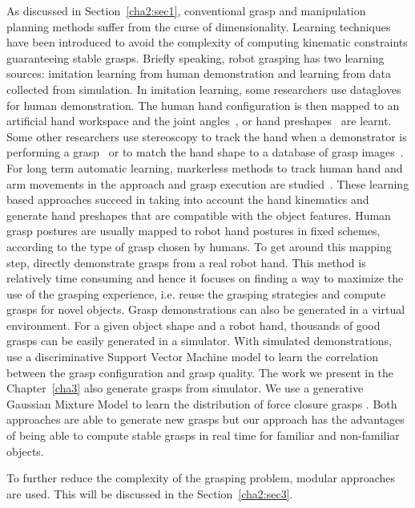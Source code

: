 As discussed in Section~\ref{cha2:sec1},
conventional grasp and manipulation planning methods suffer from the curse of dimensionality.
Learning techniques have been introduced to avoid the complexity of computing kinematic constraints guaranteeing stable grasps. Briefly speaking, robot grasping has two learning sources: imitation learning from human demonstration and learning from data collected from simulation.
In imitation learning, some researchers use datagloves for human demonstration. The human hand configuration is then mapped to an artificial hand workspace and the joint angles~\citep{Fischer1998,ekvall2007learning}, or hand preshapes~\citep{Kyota2005, pelossof2004svm, Li07} are learnt. Some other researchers use stereoscopy to track the hand when a demonstrator is performing a grasp~\citep{hueser2006learning} or to match the hand shape to a database of grasp images~\citep{Romero2008}. For long term automatic learning, markerless methods to track human hand and arm movements in the approach and grasp execution are studied~\citep{ekvall2007learning,do2009grasp}. These learning based approaches succeed in taking into account the hand kinematics and generate hand preshapes that are compatible with the object features.
Human grasp postures are usually mapped to robot hand postures in fixed schemes, according to the type of grasp chosen by humans.
To get around this mapping step, \citet{herzog2014learning} directly demonstrate grasps from a real robot hand. This method is relatively time consuming and hence it focuses on finding a way to maximize the use of the grasping experience, i.e. reuse the grasping strategies and compute grasps for novel objects.
Grasp demonstrations can also be generated in a virtual environment.
For a given object shape and a robot hand, thousands of good grasps can be easily generated in a simulator. With simulated demonstrations, \citet{pelossof2004svm} use a discriminative Support Vector Machine model to learn the correlation between the grasp configuration and grasp quality.
The work we present in the Chapter~\ref{cha3} also generate grasps from simulator. We use a generative Gaussian Mixture Model to learn the distribution of force closure grasps \citep{bidan2013grasp}. Both approaches are able to generate new grasps but our approach has the advantages of being able to compute stable grasps in real time for familiar and non-familiar objects.

To further reduce the complexity of the grasping problem, modular approaches are used. This will be discussed in the Section~\ref{cha2:sec3}.

